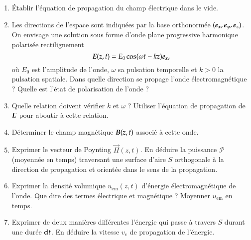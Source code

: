 \begin{exocor}
	\begin{enumerate}
		\item Établir l'équation de propagation du champ électrique dans 
		  le vide.
		\item Les directions de l'espace sont indiquées par la base 
		  orthonormée $(\ex, \ey, \ez)$. On envisage une solution sous 
		  forme d'onde plane progressive harmonique polarisée rectilignement
		  \begin{equation*}
			  \vece(z, t) = E_0 \cos(\omega t - k z)\ex,
		  \end{equation*}
		  où $E_0$ est l'amplitude de l'onde, $\omega$ sa pulsation temporelle
		  et $k > 0$ la pulsation spatiale. Dans quelle direction se propage
		  l'onde électromagnétique ? Quelle est l'état de polarisation 
		  de l'onde ?
	  	\item Quelle relation doivent vérifier $k$ et $\omega$ ? Utiliser
		  l'équation de propagation de $\vece$ pour aboutir à cette relation.
	  \item Déterminer le champ magnétique $\vecb(z, t)$ associé à cette onde.
	  \item Exprimer le vecteur de Poynting $\vec{\Pi}(z, t)$. 
		  En déduire la puissance 
		  $\mathcal{P}$ (moyennée en temps) traversant une surface d'aire
		  $S$ orthogonale à la direction de propagation et orientée
		  dans le sens de la propagation.
	  \item Exprimer la densité volumique $u_\mathrm{em}(z, t)$ d'énergie 
		  électromagnétique de l'onde. Que dire des termes électrique
		  et magnétique ? Moyenner $u_\mathrm{em}$ en temps. 
		\item Exprimer de deux manières différentes l'énergie qui passe 
		  à travers $S$ durant une durée $\mathrm{d}t$. En déduire
		  la vitesse $v_e$ de propagation de l'énergie.
	\end{enumerate}
\end{exocor}

